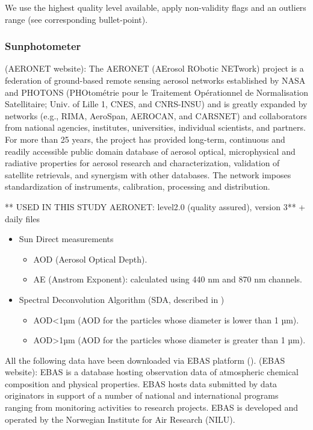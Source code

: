\documentclass[journal abbreviation, manuscript]{copernicus}
\begin{document}
We use the highest quality level available, apply non-validity flags and an outliers range (see corresponding bullet-point).

\subsubsection{Sunphotometer}
(AERONET website): The AERONET (AErosol RObotic NETwork) project is a federation of ground-based remote sensing aerosol networks established by NASA and PHOTONS (PHOtométrie pour le Traitement Opérationnel de Normalisation Satellitaire; Univ. of Lille 1, CNES, and CNRS-INSU) and is greatly expanded by networks (e.g., RIMA, AeroSpan, AEROCAN, and CARSNET) and collaborators from national agencies, institutes, universities, individual scientists, and partners. For more than 25 years, the project has provided long-term, continuous and readily accessible public domain database of aerosol optical, microphysical and radiative properties for aerosol research and characterization, validation of satellite retrievals, and synergism with other databases. The network imposes standardization of instruments, calibration, processing and distribution.


** USED IN THIS STUDY AERONET: level2.0 (quality assured), version 3** + daily files

\begin{itemize}
 \item Sun Direct measurements
       \begin{itemize}
        \item AOD (Aerosol Optical Depth).
        \item AE (Anstrom Exponent): calculated using 440 nm and 870 nm channels.
       \end{itemize}
 \item Spectral Deconvolution Algorithm (SDA, described in \cite{o2003spectral})
       \begin{itemize}
        \item AOD<1µm (AOD for the particles whose diameter is lower than 1 µm).
        \item AOD>1µm (AOD for the particles whose diameter is greater than 1 µm).
       \end{itemize}
\end{itemize}


All the following data have been downloaded via EBAS platform (\cite{ebasweb}).
(EBAS website): EBAS is a database hosting observation data of atmospheric chemical composition and physical properties. EBAS hosts data submitted by data originators in support of a number of national and international programs ranging from monitoring activities to research projects. EBAS is developed and operated by the Norwegian Institute for Air Research (NILU).
\end{document}
